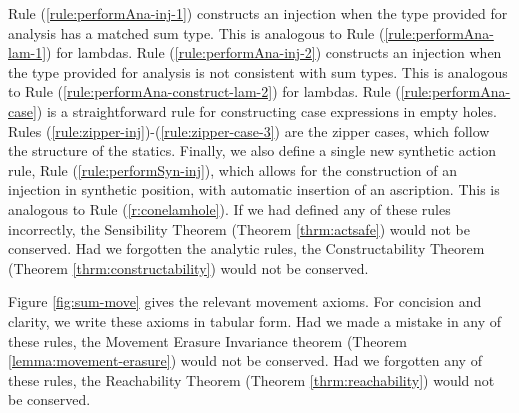 Rule (\ref{rule:performAna-inj-1}) constructs an injection when the type
provided for analysis has a matched sum type. This is analogous to Rule
(\ref{rule:performAna-lam-1}) for lambdas. Rule
(\ref{rule:performAna-inj-2}) constructs an injection when the type
provided for analysis is not consistent with sum types. This is analogous
to Rule (\ref{rule:performAna-construct-lam-2}) for lambdas. Rule
(\ref{rule:performAna-case}) is a straightforward rule for constructing
case expressions in empty holes. Rules
(\ref{rule:zipper-inj})-(\ref{rule:zipper-case-3}) are the zipper cases,
which follow the structure of the statics. Finally, we also define a single
new synthetic action rule, Rule (\ref{rule:performSyn-inj}), which allows
for the construction of an injection in synthetic position, with automatic
insertion of an ascription. This is analogous to Rule
(\ref{r:conelamhole}). If we had defined any of these rules incorrectly,
the Sensibility Theorem (Theorem \ref{thrm:actsafe}) would not be
conserved. Had we forgotten the analytic rules, the Constructability
Theorem (Theorem \ref{thrm:constructability}) would not be conserved.

Figure \ref{fig:sum-move} gives the relevant movement axioms. For concision
and clarity, we write these axioms in tabular form. Had we made a mistake
in any of these rules, the Movement Erasure Invariance theorem
(Theorem \ref{lemma:movement-erasure}) would not be conserved. Had we
forgotten any of these rules, the Reachability Theorem
(Theorem \ref{thrm:reachability}) would not be conserved.

\iffalse
\begin{displaymath}
\begin{array}{@{}r@{~}l@{~~~}c@{~~~}ll@{~~}}
  \multicolumn{5}{l}{\textbf{Type Construction Actions for Sum Type}:}
  \\
  \TABperformTyp{\zwsel{\hehole}}{\aConstructx{\fsum}}
  {\tsum{\zwsel{\hehole}}{\hehole}}
  \\[3mm]
  \multicolumn{5}{l}{\textbf{Analytical Construction Actions for Sum Type}:}
  \\
  \TABperformAna{\hGamma}{\zwsel{\hehole}}
              {\tsum{\hehole}{\hehole}}
              {\aConstructx{\finj{i}}}
              {\hinj{i}{\zwsel{\hehole}}}
  \\
  \TABperformAna{\hGamma}{\zwsel{\hehole}}
              {\htau, \tincompat{\htau}{ \tsum{\hehole}{\hehole} }}
              {\aConstructx{\finj{i}}}
              {\hhole{\hinj{i}{\zwsel{\hehole}}}}
  \\
  \TABperformAna{\hGamma}{\zwsel{\hehole}}
              {\htau}
              {\aConstructx{\fcase{x}{y}}}
              {\hcase{\zwsel{\hehole}}{x}{\hehole}{y}{\hehole}}
\end{array}
\end{displaymath}
\fi
